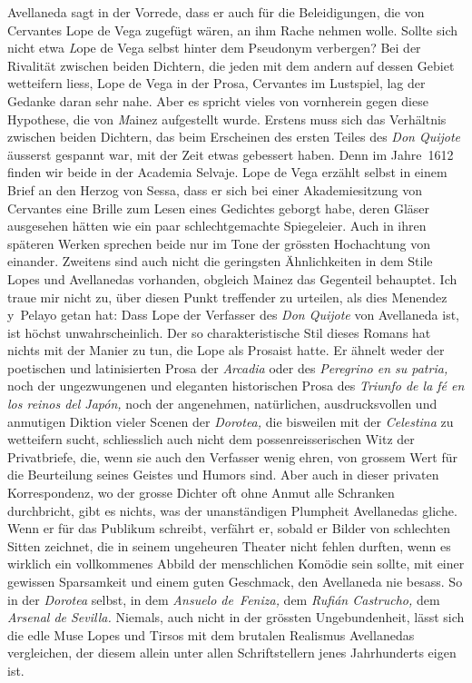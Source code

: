 Avellaneda sagt in der Vorrede, dass er auch für die Beleidigungen,
die von Cervantes Lope de Vega zugefügt wären, an ihm Rache nehmen
wolle. Sollte sich nicht etwa {\emph Lope de Vega} selbst hinter dem
Pseudonym verbergen? Bei der Rivalität zwischen beiden Dichtern, die jeden
mit dem andern auf dessen Gebiet wetteifern liess, Lope de Vega in
der Prosa, Cervantes im Lustspiel, lag der Gedanke daran sehr nahe.
Aber es spricht vieles von vornherein gegen diese Hypothese, die von
{\emph Mainez} aufgestellt wurde. Erstens muss sich das Verhältnis zwischen
beiden Dichtern, das beim Erscheinen des ersten Teiles des {\it Don Quijote}
äusserst gespannt war, mit der Zeit etwas gebessert haben. Denn im
Jahre~1612 finden wir beide in der Academia Selvaje. Lope de Vega
erzählt selbst in einem Brief an den Herzog von Sessa, dass er sich bei
einer Akademiesitzung von Cervantes eine Brille zum Lesen eines Gedichtes
geborgt habe, deren {\quoted Gläser ausgesehen hätten wie ein paar
schlechtgemachte Spiegeleier}. Auch in ihren späteren Werken sprechen
beide nur im Tone der grössten Hochachtung von einander. Zweitens sind
auch nicht die geringsten Ähnlichkeiten in dem Stile Lopes und Avellanedas
vorhanden, obgleich Mainez das Gegenteil behauptet. Ich traue
mir nicht zu, über diesen Punkt treffender zu urteilen, als dies Menendez
y~Pelayo getan hat: {\quoted Dass Lope der Verfasser des {\it Don Quijote} von
Avellaneda ist, ist höchst unwahrscheinlich. Der so charakteristische Stil
dieses Romans hat nichts mit der Manier zu tun, die Lope als Prosaist
hatte. Er ähnelt weder der poetischen und latinisierten Prosa der {\it Arcadia}
oder des {\it\spanish Peregrino en su patria,} noch der ungezwungenen und eleganten
historischen Prosa des {\it\spanish Triunfo de la fé en los reinos del Japón,} noch
der angenehmen, natürlichen, ausdrucksvollen und anmutigen Diktion
vieler Scenen der {\it Dorotea,} die bisweilen mit der {\it Celestina} zu wetteifern
sucht, schliesslich auch nicht dem possenreisserischen Witz der
Privatbriefe, die, wenn sie auch den Verfasser wenig ehren, von grossem Wert
für die Beurteilung seines Geistes und Humors sind. Aber auch in dieser
privaten Korrespondenz, wo der grosse Dichter oft ohne Anmut alle
Schranken durchbricht, gibt es nichts, was der unanständigen Plumpheit
Avellanedas gliche. Wenn er für das Publikum schreibt, verfährt er,
sobald er Bilder von schlechten Sitten zeichnet, die in seinem ungeheuren
Theater nicht fehlen durften, wenn es wirklich ein vollkommenes Abbild
der menschlichen Komödie sein sollte, mit einer gewissen Sparsamkeit
und einem guten Geschmack, den Avellaneda nie besass. So in der
{\it Dorotea} selbst, in dem {\it Ansuelo de~Feniza,} dem {\it Rufián Castrucho,}
dem {\it Arsenal de Sevilla.} Niemals, auch nicht in der grössten Ungebundenheit,
lässt sich die edle Muse Lopes und Tirsos mit dem brutalen Realismus
Avellanedas vergleichen, der diesem allein unter allen Schriftstellern
jenes Jahrhunderts eigen ist.}


